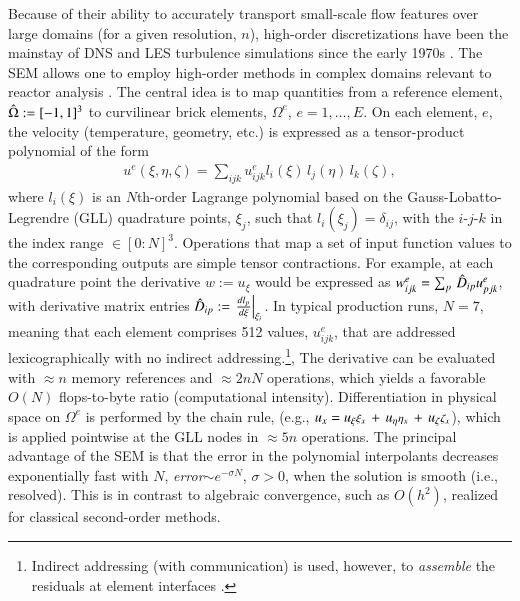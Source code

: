 Because of their ability to accurately transport small-scale flow features over
large domains (for a given resolution, $n$), high-order discretizations have
been the mainstay of DNS and LES turbulence simulations since the early 1970s
\cite{kreiss72,sao72}.   The SEM allows one to employ high-order methods in 
complex domains relevant to reactor analysis  \cite{pat84,sao80}.   
The central idea is to map
quantities from a reference element, ${\hat \Omega}:=[-1,1]^3$ to curvilinear brick
elements, $\Omega^e$, $e=1,\dots,E$.  On each element, $e$, the velocity
(temperature, geometry, etc.) is expressed as a tensor-product polynomial
of the form
\begin{eqnarray}
  u^e(\xi,\eta,\zeta) = \sum_{ijk} u_{ijk}^e l_i(\xi) \, l_j(\eta) \, l_k(\zeta),
\end{eqnarray}
where $l_i(\xi)$ is an $N$th-order Lagrange polynomial based on the
Gauss-Lobatto-Legrendre (GLL) quadrature points, $\xi_j$, such that
$l_i(\xi_j)=\delta_{ij}$, with the $i$-$j$-$k$ in the index range $\in
[0:N]^3$.  Operations that map a set of input function values to the
corresponding outputs are simple tensor contractions.
For example, at each quadrature point the derivative $w := u_{\xi}$ would be
expressed as $w^e_{ijk} = \sum_p \, {\hat D}_{ip} u_{pjk}^e$, with derivative
matrix entries ${\hat D}_{ip} := \left. \frac{d l_p}{d \xi} \right|_{\xi_i}$.   In typical
production runs, $N=7$, meaning that each element comprises 512 values,
$u_{ijk}^e$, that are addressed lexicographically with no indirect
addressing.\footnote{Indirect addressing (with communication) is used,
however, to {\em assemble} the residuals at element interfaces \cite{dfm02}.},
The derivative can be evaluated with $\approx n$ memory references and
$\approx 2nN$ operations, which yields a favorable $O(N)$ flops-to-byte ratio 
(computational intensity).
Differentiation in physical space on $\Omega^e$ is performed by the chain rule, 
(e.g., $u_x = 
u_{\xi}   \mbox{\footnotesize $\xi_x$}    \,+\, 
u_{\eta}  \mbox{\footnotesize $\eta_x$}   \,+\, 
u_{\zeta} \mbox{\footnotesize $\zeta_x$}  $), 
which is applied pointwise at the GLL nodes in $\approx 5n$ operations.  
The principal advantage of the SEM is that the error in the polynomial
interpolants decreases exponentially fast with $N$, {\em error}$\sim e^{-\sigma
N}$, $\sigma > 0$, when the solution is smooth (i.e., resolved).
This is in contrast to algebraic convergence, such as $O(h^2)$, realized
for classical second-order methods.


